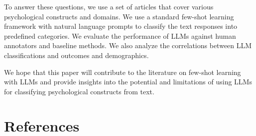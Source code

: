 \documentclass[
  10pt,
  letterpaper,
  DIV=11,
  numbers=noendperiod]{scrartcl}
\begin{document}
To answer these questions, we use a set of articles that cover various
psychological constructs and domains. We use a standard few-shot
learning framework with natural language prompts to classify the text
responses into predefined categories. We evaluate the performance of
LLMs against human annotators and baseline methods. We also analyze the
correlations between LLM classifications and outcomes and demographics.

We hope that this paper will contribute to the literature on few-shot
learning with LLMs and provide insights into the potential and
limitations of using LLMs for classifying psychological constructs from
text.

\hypertarget{references}{%
\section*{References}\label{references}}
\end{document}
